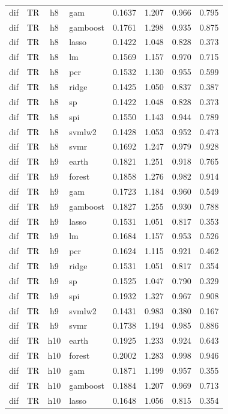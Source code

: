 \begin{ThreePartTable}
\begin{longtable}[t]{llclcccc}
dif & TR & h8 & gam & 0.1637 & 1.207 & 0.966 & 0.795\\
dif & TR & h8 & gamboost & 0.1761 & 1.298 & 0.935 & 0.875\\
dif & TR & h8 & lasso & 0.1422 & 1.048 & 0.828 & 0.373\\
dif & TR & h8 & lm & 0.1569 & 1.157 & 0.970 & 0.715\\
dif & TR & h8 & pcr & 0.1532 & 1.130 & 0.955 & 0.599\\
dif & TR & h8 & ridge & 0.1425 & 1.050 & 0.837 & 0.387\\
dif & TR & h8 & sp & 0.1422 & 1.048 & 0.828 & 0.373\\
dif & TR & h8 & spi & 0.1550 & 1.143 & 0.944 & 0.789\\
dif & TR & h8 & svmlw2 & 0.1428 & 1.053 & 0.952 & 0.473\\
dif & TR & h8 & svmr & 0.1692 & 1.247 & 0.979 & 0.928\\
\addlinespace
dif & TR & h9 & earth & 0.1821 & 1.251 & 0.918 & 0.765\\
dif & TR & h9 & forest & 0.1858 & 1.276 & 0.982 & 0.914\\
dif & TR & h9 & gam & 0.1723 & 1.184 & 0.960 & 0.549\\
dif & TR & h9 & gamboost & 0.1827 & 1.255 & 0.930 & 0.788\\
dif & TR & h9 & lasso & 0.1531 & 1.051 & 0.817 & 0.353\\
dif & TR & h9 & lm & 0.1684 & 1.157 & 0.953 & 0.526\\
dif & TR & h9 & pcr & 0.1624 & 1.115 & 0.921 & 0.462\\
dif & TR & h9 & ridge & 0.1531 & 1.051 & 0.817 & 0.354\\
dif & TR & h9 & sp & 0.1525 & 1.047 & 0.790 & 0.329\\
dif & TR & h9 & spi & 0.1932 & 1.327 & 0.967 & 0.908\\
dif & TR & h9 & svmlw2 & 0.1431 & 0.983 & 0.380 & 0.167\\
dif & TR & h9 & svmr & 0.1738 & 1.194 & 0.985 & 0.886\\
\addlinespace
dif & TR & h10 & earth & 0.1925 & 1.233 & 0.924 & 0.643\\
dif & TR & h10 & forest & 0.2002 & 1.283 & 0.998 & 0.946\\
dif & TR & h10 & gam & 0.1871 & 1.199 & 0.957 & 0.355\\
dif & TR & h10 & gamboost & 0.1884 & 1.207 & 0.969 & 0.713\\
dif & TR & h10 & lasso & 0.1648 & 1.056 & 0.815 & 0.354\\

\end{longtable}
\end{ThreePartTable}
